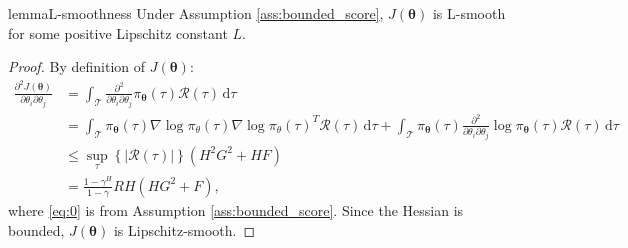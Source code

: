 \documentclass{article}
\theoremstyle{remark}
\theoremstyle{definition}
\newcommand{\Dij}[2]{\frac{\partial^{2}{#1}}{\partial{#2}_i\partial{#2}_j}}
\newcommand{\de}{\,\mathrm{d}}
\newcommand{\vtheta}{\boldsymbol{\theta}}
\newcommand{\Tspace}{\mathcal{T}}
\newcommand{\Reward}{\mathcal{R}}
\newcommand{\pol}{\pi_{\vtheta}}
\newcommand{\score}[2]{\nabla\log\pi_{#1}(#2)}
\newcommand{\GRADLOG}{G}
\newcommand{\HESSLOG}{F}
\begin{document}
 
\begin{restatable}[]{lemma}{L-smoothness}\label{lemma:lsmooth}
	Under Assumption \ref{ass:bounded_score}, $J(\vtheta)$ is L-smooth for some positive Lipschitz constant $L$.
\end{restatable}
\begin{proof}
By definition of $J(\vtheta)$:
\begin{align}
\Dij{J(\vtheta)}{\theta} 
&= \int_{\Tspace}\Dij{}{\theta}\pol(\tau)\Reward(\tau)\de \tau
\nonumber\\ 
&= \int_{\Tspace}\pol(\tau)\score{\theta}{\tau}\score{\theta}{\tau}^T\Reward(\tau)\de \tau + \int_{\Tspace}\pol(\tau)\Dij{}{\theta}\log\pol(\tau)\Reward(\tau)\de \tau \nonumber\\
&\leq \sup_{\tau} \left\{\left|\Reward(\tau)\right|\right\} \left(H^2\GRADLOG^2+H\HESSLOG\right) \label{eq:0}\\
&= \frac{1-\gamma^H}{1-\gamma}RH\left(H\GRADLOG^2+\HESSLOG\right),\nonumber
\end{align}
where \ref{eq:0} is from Assumption \ref{ass:bounded_score}.
Since the Hessian is bounded, $J(\vtheta)$ is Lipschitz-smooth.
\end{proof}
\end{document}
